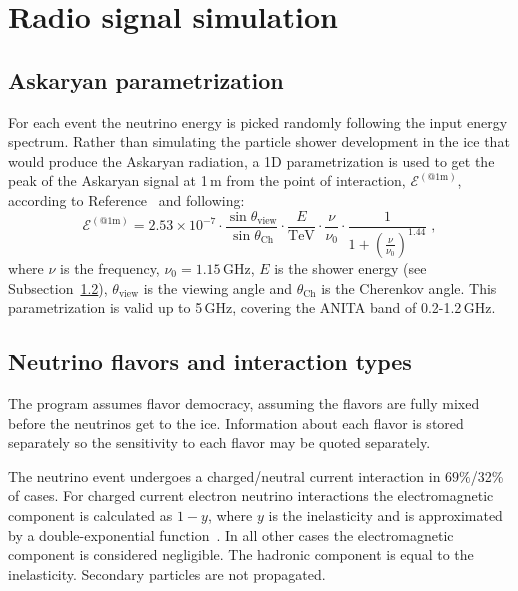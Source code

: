 \section{Radio signal simulation} 
\label{sec:rf}

\subsection{Askaryan parametrization}
For each event the neutrino energy is picked randomly following the input energy spectrum.
Rather than simulating the particle shower development in the ice that
would produce the Askaryan radiation, a 1D parametrization is used 
to get the peak of the Askaryan signal at 1\,m from the point of interaction, $\mathcal{E}^{(\mathrm{@ 1m})}$, 
according to Reference~\cite{JaimeAskarian2000} and following:
\begin{equation}
\label{eq:vmmhz}
\mathcal{E}^{(\mathrm{@ 1m})} =2.53\times 10^{-7}\cdot \frac{\sin{\theta_{\mathrm{view}}}}{\sin{\theta_{\mathrm{Ch}}}}\cdot  \frac{E}{\mathrm{TeV}} \cdot \frac{\nu}{\nu_0} \cdot \frac{1}{1+\left( \frac{\nu}{\nu_0} \right)^{1.44}} \;,
\end{equation}
\noindent where $\nu$ is the frequency, $\nu_0=1.15$\,GHz, $E$ is
the shower energy (see Subsection~\ref{subsec:emhadshower}),
$\theta_{\mathrm{view}}$ is the viewing angle and $\theta_{\mathrm{Ch}}$ is the Cherenkov angle.
This parametrization is valid up to 5\,GHz, covering the ANITA
band of 0.2-1.2\,GHz.

\subsection{Neutrino flavors and interaction types}
\label{subsec:emhadshower}
The \icemc program assumes flavor democracy, assuming 
the flavors are fully mixed before the neutrinos get to the ice.
Information about each flavor is stored separately so the sensitivity to each flavor may be quoted separately.

The neutrino event undergoes a charged/neutral current interaction in
$69\%$/32\% of cases.
For charged current electron neutrino interactions the electromagnetic
component is calculated as $1-y$, where $y$ is the inelasticity and is
approximated by a double-exponential function~\cite{gandhi}. 
In all other cases the electromagnetic component is considered negligible.
The hadronic component is equal to the inelasticity.
Secondary particles are not propagated.

